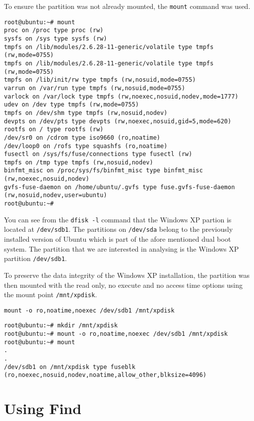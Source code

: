 \documentclass[a4paper,
    11pt,
    normalheadings,
    parindent,
    UKenglish,
    abstracton,
    ]{scrartcl}
\begin{document}
To ensure the partition was not already mounted, the {\tt mount} command was used.

\begin{verbatim}
root@ubuntu:~# mount
proc on /proc type proc (rw)
sysfs on /sys type sysfs (rw)
tmpfs on /lib/modules/2.6.28-11-generic/volatile type tmpfs (rw,mode=0755)
tmpfs on /lib/modules/2.6.28-11-generic/volatile type tmpfs (rw,mode=0755)
tmpfs on /lib/init/rw type tmpfs (rw,nosuid,mode=0755)
varrun on /var/run type tmpfs (rw,nosuid,mode=0755)
varlock on /var/lock type tmpfs (rw,noexec,nosuid,nodev,mode=1777)
udev on /dev type tmpfs (rw,mode=0755)
tmpfs on /dev/shm type tmpfs (rw,nosuid,nodev)
devpts on /dev/pts type devpts (rw,noexec,nosuid,gid=5,mode=620)
rootfs on / type rootfs (rw)
/dev/sr0 on /cdrom type iso9660 (ro,noatime)
/dev/loop0 on /rofs type squashfs (ro,noatime)
fusectl on /sys/fs/fuse/connections type fusectl (rw)
tmpfs on /tmp type tmpfs (rw,nosuid,nodev)
binfmt_misc on /proc/sys/fs/binfmt_misc type binfmt_misc (rw,noexec,nosuid,nodev)
gvfs-fuse-daemon on /home/ubuntu/.gvfs type fuse.gvfs-fuse-daemon (rw,nosuid,nodev,user=ubuntu)
root@ubuntu:~#
\end{verbatim}


You can see from the {\tt dfisk -l} command that the Windows XP partion is located at {\tt /dev/sdb1}.
The partitions on {\tt /dev/sda} belong to the previously installed version of Ubuntu which is part of the afore mentioned dual boot system.
The partition that we are interested in analysing is the Windows XP partition {\tt /dev/sdb1}.

To preserve the data integrity of the Windows XP installation, the partition was then mounted with the read only, no execute and no access time options using the mount point {\tt /mnt/xpdisk}.

\begin{verbatim}
mount -o ro,noatime,noexec /dev/sdb1 /mnt/xpdisk
\end{verbatim}

\begin{verbatim}
root@ubuntu:~# mkdir /mnt/xpdisk
root@ubuntu:~# mount -o ro,noatime,noexec /dev/sdb1 /mnt/xpdisk
root@ubuntu:~# mount
.
.
/dev/sdb1 on /mnt/xpdisk type fuseblk (ro,noexec,nosuid,nodev,noatime,allow_other,blksize=4096)
\end{verbatim}

\section{Using Find}
\end{document}
